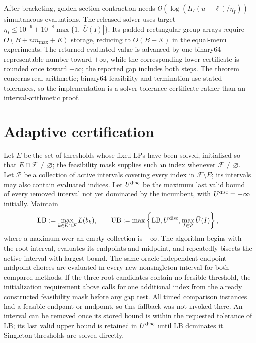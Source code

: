 \documentclass[11pt]{article}
\theoremstyle{plain}
\theoremstyle{definition}
\theoremstyle{remark}
\begin{document}
After bracketing, golden-section contraction needs $O(\log(H_I(u-\ell)/\eta_I))$ simultaneous evaluations.  The released solver uses target $\eta_I\le10^{-9}+10^{-8}\max\{1,|\bar U(I)|\}$.  Its padded rectangular group arrays require $O(B+n m_{\max}+K)$ storage, reducing to $O(B+K)$ in the equal-menu experiments.  The returned evaluated value is advanced by one binary64 representable number toward $+\infty$, while the corresponding lower certificate is rounded once toward $-\infty$; the reported gap includes both steps.  The theorem concerns real arithmetic; binary64 feasibility and termination use stated tolerances, so the implementation is a solver-tolerance certificate rather than an interval-arithmetic proof.

\section{Adaptive certification}\label{sec:adaptive}

Let $E$ be the set of thresholds whose fixed LPs have been solved, initialized so that $E\cap\mathcal F\ne\varnothing$; the feasibility mask supplies such an index whenever $\mathcal F\ne\varnothing$.  Let $\mathcal P$ be a collection of active intervals covering every index in $\mathcal F\setminus E$; its intervals may also contain evaluated indices.  Let $U^{\rm disc}$ be the maximum last valid bound of every removed interval not yet dominated by the incumbent, with $U^{\rm disc}=-\infty$ initially.  Maintain
\[
\mathrm{LB}:=\max_{k\in E\cap\mathcal F}L(b_k),
\qquad
\mathrm{UB}:=\max\left\{\mathrm{LB},U^{\rm disc},\max_{I\in\mathcal P}\bar U(I)\right\},
\]
where a maximum over an empty collection is $-\infty$.  The algorithm begins with the root interval, evaluates its endpoints and midpoint, and repeatedly bisects the active interval with largest bound.  The same oracle-independent endpoint--midpoint choices are evaluated in every new nonsingleton interval for both compared methods.  If the three root candidates contain no feasible threshold, the initialization requirement above calls for one additional index from the already constructed feasibility mask before any gap test.  All timed comparison instances had a feasible endpoint or midpoint, so this fallback was not invoked there.  An interval can be removed once its stored bound is within the requested tolerance of $\mathrm{LB}$; its last valid upper bound is retained in $U^{\rm disc}$ until $\mathrm{LB}$ dominates it.  Singleton thresholds are solved directly.
\end{document}
